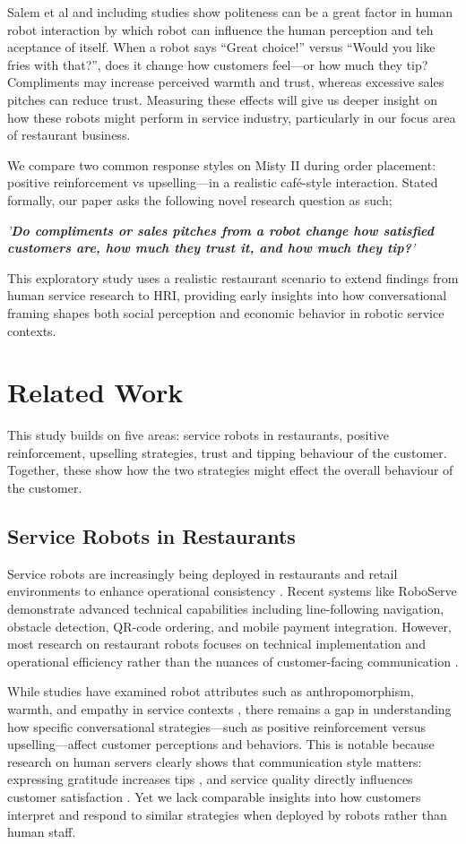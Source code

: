 \documentclass[conference]{IEEEtran}
\begin{document}
Salem et al and including studies \cite{b5} show politeness can be a great factor in human robot interaction by which robot can influence the human perception and teh aceptance of itself. When a robot says ``Great choice!'' versus ``Would you like fries with that?'', does it change how customers feel—or how much they tip? Compliments may increase perceived warmth and trust, whereas excessive sales pitches can reduce trust. Measuring these effects will give us deeper insight on how these robots might perform in service industry, particularly in our focus area of restaurant business.

We compare two common response styles on Misty II during order placement: positive reinforcement vs upselling—in a realistic café-style interaction. Stated formally, our paper asks the following novel research question as such;

\textit{'\textbf{Do compliments or sales pitches from a robot change how satisfied customers are, how much they trust it, and how much they tip?}'}

This exploratory study uses a realistic restaurant scenario to extend findings from human service research to HRI, providing early insights into how conversational framing shapes both social perception and economic behavior in robotic service contexts.
\section{Related Work}
\label{sec:related_work}
This study builds on five areas: service robots in restaurants, positive reinforcement, upselling strategies, trust and tipping behaviour of the customer. Together, these show how the two strategies might effect the overall behaviour of the customer.

\subsection{Service Robots in Restaurants}
Service robots are increasingly being deployed in restaurants and retail environments to enhance operational consistency \cite{b1, b2}.
Recent systems like RoboServe \cite{b34} demonstrate advanced technical capabilities including line-following navigation, obstacle detection, QR-code ordering, and mobile payment integration.
However, most research on restaurant robots focuses on technical implementation and operational efficiency rather than the nuances of customer-facing communication \cite{b5}.

While studies have examined robot attributes such as anthropomorphism, warmth, and empathy in service contexts \cite{b6, b13, b14}, there remains a gap in understanding how specific conversational strategies—such as positive reinforcement versus upselling—affect customer perceptions and behaviors. This is notable because research on human servers clearly shows that communication style matters: expressing gratitude increases tips \cite{b3}, and service quality directly influences customer satisfaction \cite{b4}. Yet we lack comparable insights into how customers interpret and respond to similar strategies when deployed by robots rather than human staff.
\end{document}
